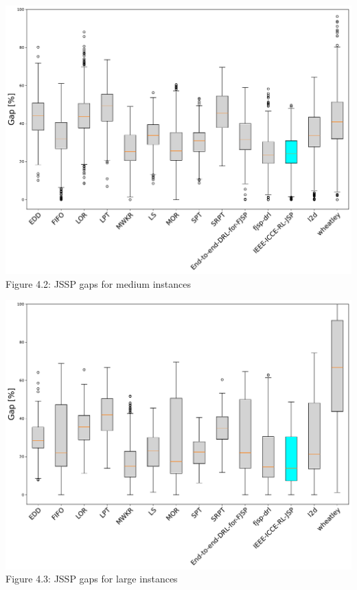 \begin{center}
    \includegraphics[width=0.9\linewidth]{images/horizontal_boxplot_jssp_medium.pdf}\\
    Figure 4.2: JSSP gaps for medium instances
\end{center}
\begin{center}
    \includegraphics[width=0.9\linewidth]{images/horizontal_boxplot_jssp_large.pdf}\\
    Figure 4.3: JSSP gaps for large instances
\end{center}
